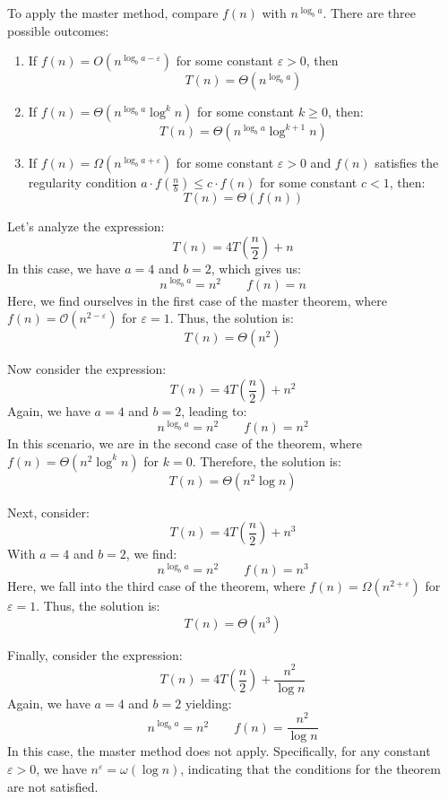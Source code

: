 To apply the master method, compare $f(n)$ with $n^{\log_ba}$. 
There are three possible outcomes:
\begin{enumerate}
    \item If $f(n)=O(n^{\log_ba-\varepsilon})$ for some constant $\varepsilon > 0$, then
        \[T(n)=\Theta(n^{\log_ba})\]
    \item If $f(n)=\Theta(n^{\log_ba}\log^kn)$ for some constant $k \geq 0$, then: 
        \[T(n)=\Theta(n^{\log_ba}\log^{k+1}n)\]
    \item If $f(n)=\Omega(n^{\log_ba+\varepsilon})$ for some constant $\varepsilon > 0$ and $f(n)$ satisfies the regularity condition $a \cdot f\left(\frac{n}{b}\right) \leq c \cdot f(n)$ for some constant $c < 1$, then:
        \[T(n)=\Theta(f(n))\]
\end{enumerate}
\begin{example}
    Let's analyze the expression:
    \[T(n)=4T\left(\frac{n}{2}\right)+n\]
    In this case, we have $a=4$ and $b=2$, which gives us:
    \[n^{\log_ba}=n^2 \qquad f(n)=n\]
    Here, we find ourselves in the first case of the master theorem, where $f(n)=\mathcal{O}(n^{2-\varepsilon})$ for $\varepsilon=1$. 
    Thus, the solution is:
    \[T(n)=\Theta(n^2)\]

    Now consider the expression:
    \[T(n)=4T\left(\frac{n}{2}\right)+n^2\]
    Again, we have $a=4$ and $b=2$, leading to:
    \[n^{\log_ba}=n^2 \qquad f(n)=n^2\]
    In this scenario, we are in the second case of the theorem, where $f(n)=\Theta(n^2\log^kn)$ for $k=0$. 
    Therefore, the solution is:
    \[T(n)=\Theta(n^2\log n)\]

    Next, consider:
    \[T(n)=4T\left(\frac{n}{2}\right)+n^3\]
    With $a=4$ and $b=2$, we find:
    \[n^{\log_ba}=n^2 \qquad f(n)=n^3\]
    Here, we fall into the third case of the theorem, where $f(n)=\Omega(n^{2+\varepsilon})$ for $\varepsilon=1$. 
    Thus, the solution is:
    \[T(n)=\Theta(n^3)\]

    Finally, consider the expression:
    \[T(n)=4T\left(\frac{n}{2}\right)+\frac{n^2}{\log n}\]
    Again, we have $a=4$ and $b=2$ yielding:
    \[n^{\log_ba}=n^2 \qquad f(n)=\frac{n^2}{\log n}\]
    In this case, the master method does not apply. 
    Specifically, for any constant $\varepsilon > 0$, we have $n^\varepsilon = \omega(\log n)$, indicating that the conditions for the theorem are not satisfied.
\end{example}